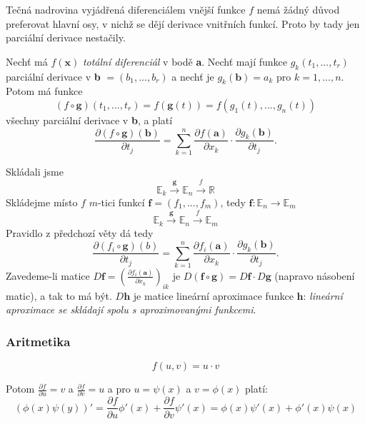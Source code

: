 \documentclass[../main.tex]{subfiles}
\begin{document}
\begin{intuition}
	Tečná nadrovina vyjádřená diferenciálem vnější funkce $f$ nemá žádný důvod preferovat hlavní osy, v nichž se 
	dějí derivace vnitřních funkcí. Proto by tady jen parciální derivace nestačily.
\end{intuition}

\begin{theorem}
	Nechť má $f(\textbf{x})$ \textit{totální diferenciál} v bodě \textbf{a}. Nechť mají funkce $g_k(t_1,...,t_r)$ parciální 
	derivace v \textbf{b} $= (b_1,...,b_r)$ a nechť je $g_k(\textbf{b}) = a_k$ pro $k = 1,...,n.$ Potom má funkce
	\[(f\circ \textbf{g})(t_1,...,t_r) = f(\textbf{g}(t)) = f(g_1(t),...,g_n(t))\]
	všechny parciální derivace v \textbf{b}, a platí 
	\[\frac{\partial (f \circ \textbf{g})(\textbf{b})}{\partial t_j} = \sum^n_{k=1}\frac{\partial f(\textbf{a})}{\partial x_k}
	\cdot \frac{\partial g_k(\textbf{b})}{\partial t_j}.\]
\end{theorem}

Skládali jsme
\[\mathbb{E}_k \xrightarrow{\mathbf{g}} \mathbb{E}_n \xrightarrow{\textit{f}} \mathbb{R} \]
Skládejme místo $f$ $m$-tici funkcí
$\mathbf{f} = (f_1,...,f_m)$, tedy $\mathbf{f}: \mathbb{E}_n \rightarrow \mathbb{E}_m$
\[\mathbb{E}_k \xrightarrow{\mathbf{g}} \mathbb{E}_n \xrightarrow{\textit{f}} \mathbb{E}_m \]
Pravidlo z předchozí věty dá tedy
\[\frac{\partial (f_i \circ \mathbf{g})(b)}{\partial t_j} = \sum^n_{k=1} \frac{\partial f_i(\mathbf{a})}{\partial x_k}
\cdot \frac{\partial g_k(\mathbf{b})}{\partial t_j}.\]
Zavedeme-li matice $D\mathbf{f} = \left(\frac{\partial f_i(\mathbf{a})}{\partial x_k}\right)_{ik}$ je 
$D(\mathbf{f}\circ \mathbf{g}) = D\mathbf{f}\cdot D\mathbf{g}$ (napravo násobení matic), a tak to má být. $D\mathbf{h}$ je matice lineární aproximace 
funkce $\mathbf{h}$: \textit{lineární aproximace se skládají spolu s aproximovanými funkcemi}.
\noindent

\subsubsection{Aritmetika}
\[ f(u,v) = u \cdot v \]

Potom $ \frac{\partial f}{\partial u} = v $ a $ \frac{\partial f}{\partial v} = u $
a pro $u = \psi (x)$ a $ v = \phi (x) $ platí:
\[ (\phi (x) \psi (y))' =
\frac{\partial f}{\partial u} \phi '(x) + \frac{\partial f}{\partial v} \psi '(x) = 
\phi (x)\psi '(x) + \phi '(x)\psi (x)  \]

\end{document}
